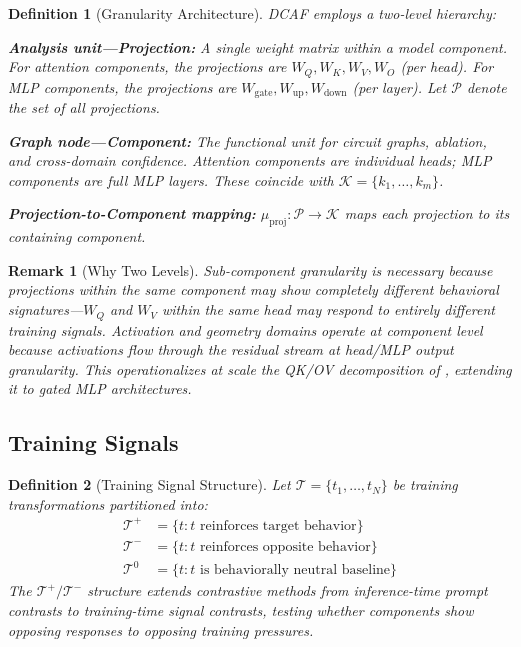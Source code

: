\documentclass[11pt]{article}
\newtheorem{definition}{Definition}[section]
\newtheorem{remark}{Remark}[section]
\begin{document}
\begin{definition}[Granularity Architecture]
\label{def:granularity}
DCAF employs a two-level hierarchy:

\textbf{Analysis unit---Projection:} A single weight matrix within a model component. For attention components, the projections are $W_Q, W_K, W_V, W_O$ (per head). For MLP components, the projections are $W_{\text{gate}}, W_{\text{up}}, W_{\text{down}}$ (per layer). Let $\mathcal{P}$ denote the set of all projections.

\textbf{Graph node---Component:} The functional unit for circuit graphs, ablation, and cross-domain confidence. Attention components are individual heads; MLP components are full MLP layers. These coincide with $\mathcal{K} = \{k_1, \ldots, k_m\}$.

\textbf{Projection-to-Component mapping:} $\mu_{\text{proj}}: \mathcal{P} \to \mathcal{K}$ maps each projection to its containing component.
\end{definition}

\begin{remark}[Why Two Levels]
Sub-component granularity is necessary because projections within the same component may show completely different behavioral signatures---$W_Q$ and $W_V$ within the same head may respond to entirely different training signals. Activation and geometry domains operate at component level because activations flow through the residual stream at head/MLP output granularity. This operationalizes at scale the QK/OV decomposition of \citet{elhage2021mathematical}, extending it to gated MLP architectures.
\end{remark}

\subsection{Training Signals}

\begin{definition}[Training Signal Structure]
Let $\mathcal{T} = \{t_1, \ldots, t_N\}$ be training transformations partitioned into:
\begin{align}
\mathcal{T}^+ &= \{t : t \text{ reinforces target behavior}\} \\
\mathcal{T}^- &= \{t : t \text{ reinforces opposite behavior}\} \\
\mathcal{T}^0 &= \{t : t \text{ is behaviorally neutral baseline}\}
\end{align}
The $\mathcal{T}^+/\mathcal{T}^-$ structure extends contrastive methods \citep{panickssery2024caa,arditi2024refusal} from inference-time prompt contrasts to training-time signal contrasts, testing whether components show opposing responses to opposing training pressures.
\end{definition}
\end{document}
